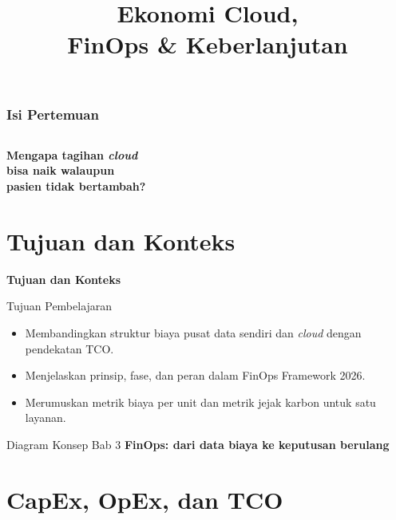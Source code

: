 \documentclass[aspectratio=169, table, 12pt]{beamer}
\title{\Huge Ekonomi Cloud,\\ \vspace{10pt} FinOps \& Keberlanjutan}
\begin{document}
\frame{\titlepage}

\begin{frame}
  \frametitle{Isi Pertemuan}
  \vspace{14pt}
  \begin{columns}[t]
    {\small\tableofcontents[sections={1-4}]}

    {\small\tableofcontents[sections={5-8}]}
  \end{columns}
\end{frame}

\begin{frame}{\hfill}
  \centering
  \Huge{\textbf{Mengapa tagihan \textit{cloud}\\bisa naik walaupun\\pasien tidak bertambah?}}
\end{frame}

\section{Tujuan dan Konteks}

\begin{frame}{\hfill}
  \centering
  \Huge{\textbf{Tujuan dan Konteks}}
\end{frame}

\begin{frame}{{\Large Tujuan Pembelajaran}}
  \vspace{10pt}
  \begin{itemize}
    \item Membandingkan struktur biaya pusat data sendiri dan \textit{cloud}
          dengan pendekatan TCO.
    \item Menjelaskan prinsip, fase, dan peran dalam FinOps Framework 2026.
    \item Merumuskan metrik biaya per unit dan metrik jejak karbon untuk satu
          layanan.
  \end{itemize}
\end{frame}

\begin{frame}{{\Large Diagram Konsep Bab 3}}
  \centering
  {\small\bfseries FinOps: dari data biaya ke keputusan berulang}\par\medskip
\end{frame}

\section{CapEx, OpEx, dan TCO}
\end{document}
